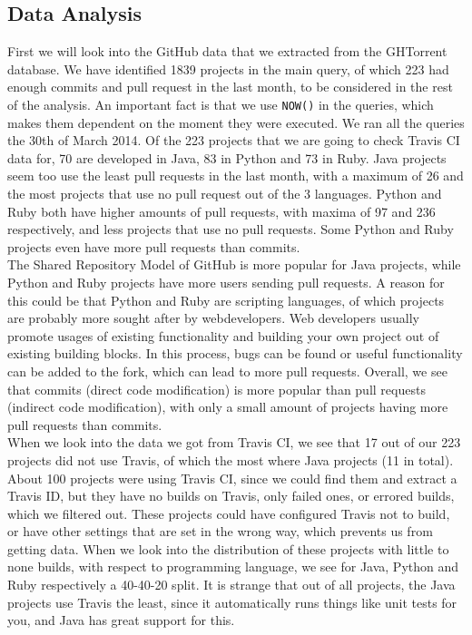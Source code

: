 \documentclass[a4paper,11pt]{article}
\begin{document}
		\subsection{Data Analysis}
			First we will look into the GitHub data that we extracted from the GHTorrent database. We have identified 1839 projects in the main query, of which 223 had enough commits and pull request in the last month, to be considered in the rest of the analysis. An important fact is that we use \texttt{NOW()} in the queries, which makes them dependent on the moment they were executed. We ran all the queries the 30th of March 2014. Of the 223 projects that we are going to check Travis CI data for, 70 are developed in Java, 83 in Python and 73 in Ruby. Java projects seem too use the least pull requests in the last month, with a maximum of 26 and the most projects that use no pull request out of the 3 languages. Python and Ruby both have higher amounts of pull requests, with maxima of 97 and 236 respectively, and less projects that use no pull requests. Some Python and Ruby projects even have more pull requests than commits. \\

			The Shared Repository Model of GitHub is more popular for Java projects, while Python and Ruby projects have more users sending pull requests. A reason for this could be that Python and Ruby are scripting languages, of which projects are probably more sought after by webdevelopers. Web developers usually promote usages of existing functionality and building your own project out of existing building blocks. In this process, bugs can be found or useful functionality can be added to the fork, which can lead to more pull requests. Overall, we see that commits (direct code modification) is more popular than pull requests (indirect code modification), with only a small amount of projects having more pull requests than commits. \\

			When we look into the data we got from Travis CI, we see that 17 out of our 223 projects did not use Travis, of which the most where Java projects (11 in total).  About 100 projects were using Travis CI, since we could find them and extract a Travis ID, but they have no builds on Travis, only failed ones, or errored builds, which we filtered out. These projects could have configured Travis not to build, or have other settings that are set in the wrong way, which prevents us from getting data. When we look into the distribution of these projects with little to none builds, with respect to programming language, we see for Java, Python and Ruby respectively a 40-40-20 split. It is strange that out of all projects, the Java projects use Travis the least, since it automatically runs things like unit tests for you, and Java has great support for this.\\
\end{document}
